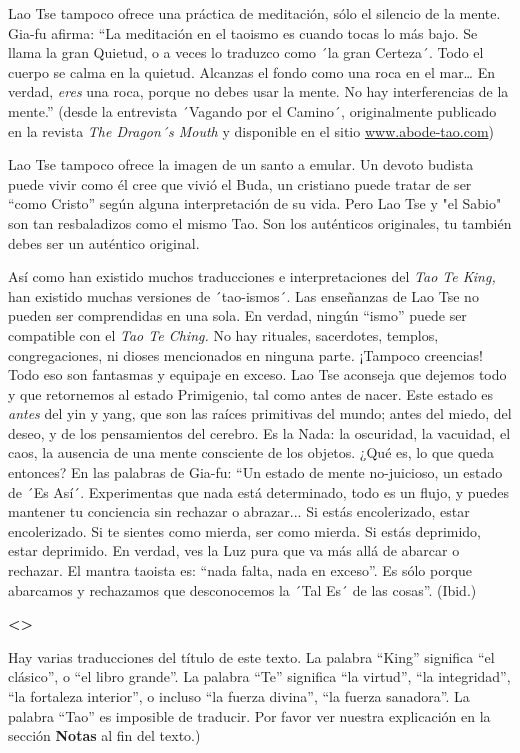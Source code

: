 Lao Tse tampoco ofrece una práctica de meditación, sólo el silencio de
la mente. Gia-fu afirma: ``La meditación en el taoismo es cuando tocas
lo más bajo. Se llama la gran Quietud, o a veces lo traduzco como ´la
gran Certeza´. Todo el cuerpo se calma en la quietud. Alcanzas el fondo
como una roca en el mar\ldots{} En verdad, \emph{eres} una roca, porque
no debes usar la mente. No hay interferencias de la mente.'' (desde la
entrevista ´Vagando por el Camino´, originalmente publicado en la
revista \emph{The Dragon´s Mouth} y disponible en el sitio
\href{http://www.abode-tao.com/}{{www.abode-tao.com}})

Lao Tse tampoco ofrece la imagen de un santo a emular. Un devoto budista
puede vivir como él cree que vivió el Buda, un cristiano puede tratar de
ser ``como Cristo'' según alguna interpretación de su vida. Pero Lao Tse
y "el Sabio" son tan resbaladizos como el mismo Tao. Son los auténticos
originales, tu también debes ser un auténtico original.

Así como han existido muchos traducciones e interpretaciones del
\emph{Tao Te King,} han existido muchas versiones de ´tao-ismos´. Las
enseñanzas de Lao Tse no pueden ser comprendidas en una sola. En verdad,
ningún ``ismo'' puede ser compatible con el \emph{Tao Te Ching.} No hay
rituales, sacerdotes, templos, congregaciones, ni dioses mencionados en
ninguna parte\emph{.} ¡Tampoco creencias! Todo eso son fantasmas y
equipaje en exceso. Lao Tse aconseja que dejemos todo y que retornemos
al estado Primigenio, tal como antes de nacer. Este estado es
\emph{antes} del yin y yang, que son las raíces primitivas del mundo;
antes del miedo, del deseo, y de los pensamientos del cerebro. Es la
Nada: la oscuridad, la vacuidad, el caos, la ausencia de una mente
consciente de los objetos. ¿Qué es, lo que queda entonces? En las
palabras de Gia-fu: ``Un estado de mente no-juicioso, un estado de ´Es
Así´. Experimentas que nada está determinado, todo es un flujo, y puedes
mantener tu conciencia sin rechazar o abrazar... Si estás encolerizado,
estar encolerizado. Si te sientes como mierda, ser como mierda. Si estás
deprimido, estar deprimido. En verdad, ves la Luz pura que va más allá
de abarcar o rechazar. El mantra taoista es: ``nada falta, nada en
exceso''. Es sólo porque abarcamos y rechazamos que desconocemos la ´Tal
Es´ de las cosas''. (Ibid.)

\textbf{\textless\textgreater{}}

Hay varias traducciones del título de este texto. La palabra ``King''
significa ``el clásico'', o ``el libro grande''. La palabra ``Te''
significa ``la virtud'', ``la integridad'', ``la fortaleza interior'', o
incluso ``la fuerza divina'', ``la fuerza sanadora''. La palabra ``Tao''
es imposible de traducir. Por favor ver nuestra explicación en la
sección \textbf{Notas} al fin del texto.)

